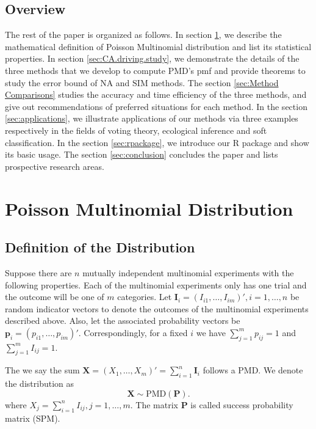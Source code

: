 \documentclass[12pt]{article}
\newcommand{\Ivec}{{\boldsymbol{I}}}
\newcommand{\Pmat}{\mathbf{P}}
\newcommand{\pvec}{\boldsymbol{p}}
\newcommand{\PMD}{\textrm{PMD}}
\newcommand{\Xvec}{\boldsymbol{X}}
\newcommand{\SIM}{{\textrm{SIM}}}
\newcommand{\NA}{{\textrm{NA}}}
\begin{document}
\subsection{Overview}
The rest of the paper is organized as follows. In section \ref{sec:pmd}, we describe the mathematical definition of Poisson Multinomial distribution and list its statistical properties. In section \ref{sec:CA.driving.study}, we demonstrate the details of  the three methods that we develop to compute $\PMD$'s pmf and provide theorems to study the error bound of $\NA$ and $\SIM$ methods.  The section \ref{sec:Method Comparisons} studies the accuracy and time efficiency of the three methods, and give out recommendations of preferred situations for each method. In the section \ref{sec:applications}, we illustrate applications of our methods via three examples respectively in the fields of voting theory, ecological inference and soft classification. In the section \ref{sec:rpackage}, we introduce our R package and show its basic usage. The section \ref{sec:conclusion} concludes the paper and lists prospective research areas.




\section{Poisson Multinomial Distribution} \label{sec:pmd}
\subsection{Definition of the Distribution}
Suppose there are $n$ mutually independent multinomial experiments with the following properties. Each of the multinomial experiments only has one trial and the outcome will be one of $m$ categories. Let $\Ivec_{i} = (I_{i1}, \dots, I_{im})', i=1, \dots, n$ be random indicator vectors to denote the outcomes of the multinomial experiments described above. Also, let the associated probability vectors be $\pvec_{i} = (p_{i1}, \dots, p_{im})'$. Correspondingly, for a fixed $i$ we have $\sum_{j=1}^{m}p_{ij}=1$ and $\sum_{j=1}^{m}I_{ij}=1$.


 The we say the sum $\Xvec = (X_{1}, \dots, X_{m})'= \sum_{i=1}^{n}\Ivec_{i}$ follows a PMD. We denote the distribution as
$$\Xvec \sim \PMD(\Pmat).$$ where $X_{j} = \sum_{i=1}^{n} I_{ij}, j=1,\dots,m$. The matrix $\Pmat$ is called success probability matrix (SPM).
\end{document}
